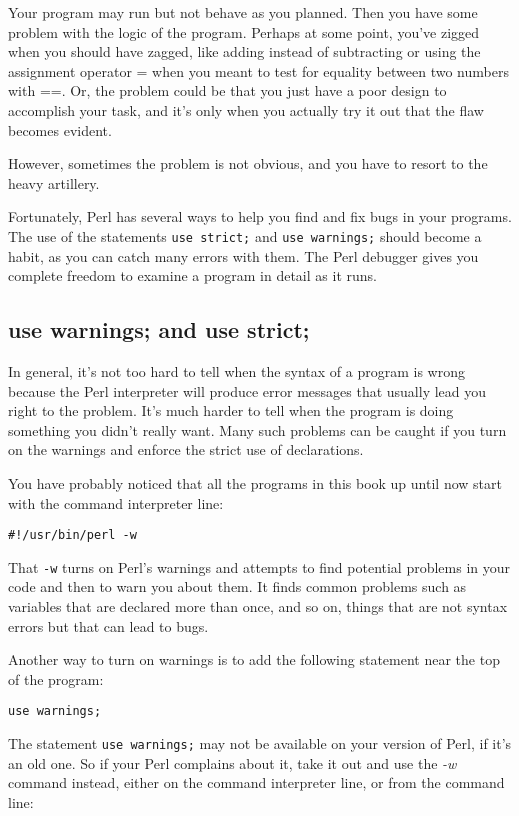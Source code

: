 Your program may run but not behave as you planned. Then you have some problem with the logic of the program. Perhaps at some point, you've zigged when you should have zagged, like adding instead of subtracting or using the assignment operator = when you meant to test for equality between two numbers with ==. Or, the problem could be that you just have a poor design to accomplish your task, and it's only when you actually try it out that the flaw becomes evident.

However, sometimes the problem is not obvious, and you have to resort to the heavy artillery.

Fortunately, Perl has several ways to help you find and fix bugs in your programs. The use of the statements \verb|use strict;| and \verb|use warnings;| should become a habit, as you can catch many errors with them. The Perl debugger gives you complete freedom to examine a program in detail as it runs.

\subsection{use warnings; and use strict;}
In general, it's not too hard to tell when the syntax of a program is wrong because the Perl interpreter will produce error messages that usually lead you right to the problem. It's much harder to tell when the program is doing something you didn't really want. Many such problems can be caught if you turn on the warnings and enforce the strict use of declarations.

You have probably noticed that all the programs in this book up until now start with the command interpreter line:

\begin{lstlisting}
#!/usr/bin/perl -w
\end{lstlisting}

That \verb|-w| turns on Perl's warnings and attempts to find potential problems in your code and then to warn you about them. It finds common problems such as variables that are declared more than once, and so on, things that are not syntax errors but that can lead to bugs.

Another way to turn on warnings is to add the following statement near the top of the program:

\begin{lstlisting}
use warnings;
\end{lstlisting}

The statement \verb|use warnings;| may not be available on your version of Perl, if it's an old one. So if your Perl complains about it, take it out and use the \textit{-w} command instead, either on the command interpreter line, or from the command line:

